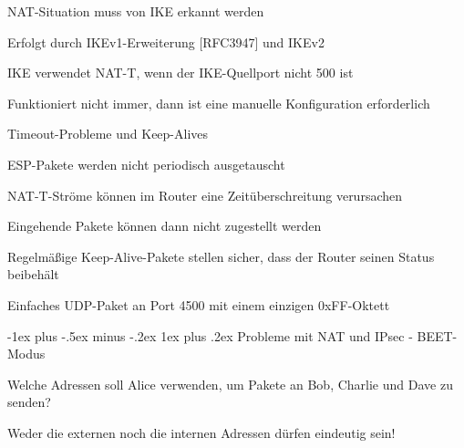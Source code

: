 \documentclass[a4paper]{article}
\makeatletter
\renewcommand{\subsubsection}{\@startsection{subsubsection}{3}{0mm}%
 {-1ex plus -.5ex minus -.2ex}%
 {1ex plus .2ex}%
 {\normalfont\small\bfseries}}
\makeatother
\begin{document}
\begin{multicols}{3}
\begin{itemize*}
\begin{itemize*}
                  \begin{itemize*}
                        \item NAT-Situation muss von IKE erkannt werden
                        \item Erfolgt durch IKEv1-Erweiterung {[}RFC3947{]} und IKEv2
                        \item IKE verwendet NAT-T, wenn der IKE-Quellport nicht 500 ist
                        \item Funktioniert nicht immer, dann ist eine manuelle Konfiguration erforderlich
                  \end{itemize*}
                  \item
                  Timeout-Probleme und Keep-Alives

                  \begin{itemize*}
                        \item ESP-Pakete werden nicht periodisch ausgetauscht
                        \item NAT-T-Ströme können im Router eine Zeitüberschreitung verursachen
                        \item Eingehende Pakete können dann nicht zugestellt werden
                        \item Regelmäßige Keep-Alive-Pakete stellen sicher, dass der Router seinen Status beibehält
                        \item Einfaches UDP-Paket an Port 4500 mit einem einzigen 0xFF-Oktett
                  \end{itemize*}
            \end{itemize*}


            \subsubsection{Probleme mit NAT und IPsec -
                  BEET-Modus}

            \begin{itemize*}
                  \item
                  Welche Adressen soll Alice verwenden, um Pakete an Bob, Charlie und
                  Dave zu senden?
                  \item
                  Weder die externen noch die internen Adressen dürfen eindeutig sein!


\end{itemize*}
\end{itemize*}
\end{multicols}
\end{document}
